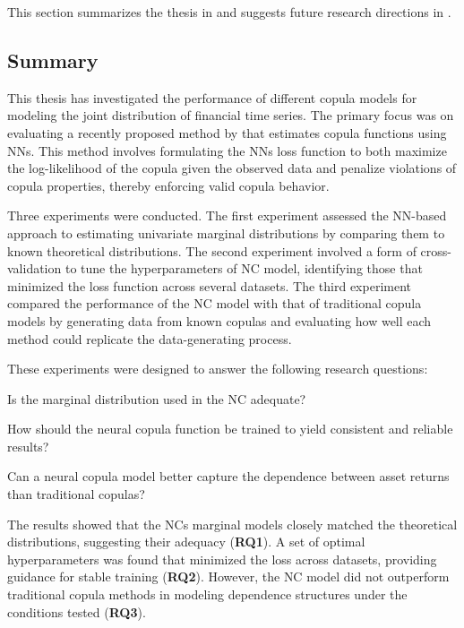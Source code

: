 This section summarizes the thesis in  and suggests future research directions in .

\subsection{Summary}\label{sec:summary}
This thesis has investigated the performance of different copula models for modeling the joint distribution of financial time series. The primary focus was on evaluating a recently proposed method by \citet[postnote]{ZengWang2022} that estimates copula functions using \gls{NN}s. This method involves formulating the \gls{NN}s loss function to both maximize the log-likelihood of the copula given the observed data and penalize violations of copula properties, thereby enforcing valid copula behavior.

Three experiments were conducted. The first experiment assessed the \gls{NN}-based approach to estimating univariate marginal distributions by comparing them to known theoretical distributions. The second experiment involved a form of cross-validation to tune the hyperparameters of \gls{NC} model, identifying those that minimized the loss function across several datasets. The third experiment compared the performance of the \gls{NC} model with that of traditional copula models by generating data from known copulas and evaluating how well each method could replicate the data-generating process. 

These experiments were designed to answer the following research questions:

\begin{compactenum}[{\bfseries RQ}1]
    \item Is the marginal distribution used in the \gls{NC} adequate?
    \item How should the neural copula function be trained to yield consistent and reliable results?
    \item Can a neural copula model better capture the dependence between asset returns than traditional copulas?
\end{compactenum}

The results showed that the \gls{NC}s marginal models closely matched the theoretical distributions, suggesting their adequacy (\textbf{RQ1}). A set of optimal hyperparameters was found that minimized the loss across datasets, providing guidance for stable training (\textbf{RQ2}). However, the \gls{NC} model did not outperform traditional copula methods in modeling dependence structures under the conditions tested (\textbf{RQ3}).

